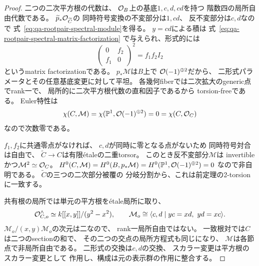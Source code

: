 \begin{proof}
二つの二次平方根の代数は、
$\mathcal O_B$上の基底$1,c,d,cd$を持つ
階数四の局所自由代数である。
$\widetilde p_*\mathcal O_{\widetilde C}$の
同時符号変換の不変部分は$1,cd$、
反不変部分は$c,d$なので
式~\eqref{eq:qa-rootpair-spectral-module}を得る。
$y=cd$による積は
式~\eqref{eq:qa-rootpair-spectral-matrix-factorization}
で与えられ、形式的には
\[
 \begin{pmatrix}0&f_2\\f_1&0\end{pmatrix}^2
      =f_1f_2 I_2
\]
というmatrix factorizationである。
$p_*\mathcal M$は$B$上で
$\mathcal O(-1)^{\oplus2}$だから、
二形式パラメータとその任意基底変更に対して平坦。
各幾何fiberでは二次拡大のgeneric点でrank一で、
局所的に二次平方根代数の直和因子であるから
torsion-freeである。
Euler特性は
\[
 \chi(C,\mathcal M)
 =\chi(\mathbb P^1,\mathcal O(-1)^{\oplus2})=0
 =\chi(C,\mathcal O_C)
\]
なので次数零である。

$f_1,f_2$に共通零点がなければ、
$c,d$が同時に零となる点がないため
同時符号対合は自由で、
$\widetilde C\to C$は有限étaleの二重torsor。
このとき反不変部分$\mathcal M$は
invertibleかつ$\mathcal M^2\simeq\mathcal O_C$。
$H^0(C,\mathcal M)=H^0(B,p_*\mathcal M)
 =H^0(\mathbb P^1,\mathcal O(-1)^{\oplus2})=0$
なので非自明である。
$\widetilde C$の三つの二次部分被覆の
分岐分割から、これは前定理の2-torsionに一致する。

共有根の局所では単元の平方根をétale局所に取り、
\[
 \mathcal O_{C,o}^{\wedge}
  \simeq k[[x,y]]/(y^2-x^2),\qquad
 \mathcal M_o\cong
   \langle c,d\mid yc=xd,\ yd=xc\rangle .
\]
$\mathcal M_o/(x,y)\mathcal M_o$の次元は二なので、
rank一局所自由ではない。
一致根対では$C$は二つのsectionの和で、
その二つの交点の局所方程式も同じになり、
$\mathcal M$は各節点で非局所自由である。
二形式の交換は$c,d$の交換、
スカラー変更は平方根のスカラー変更として
作用し、構成は元の表示群の作用に整合する。
\end{proof}

